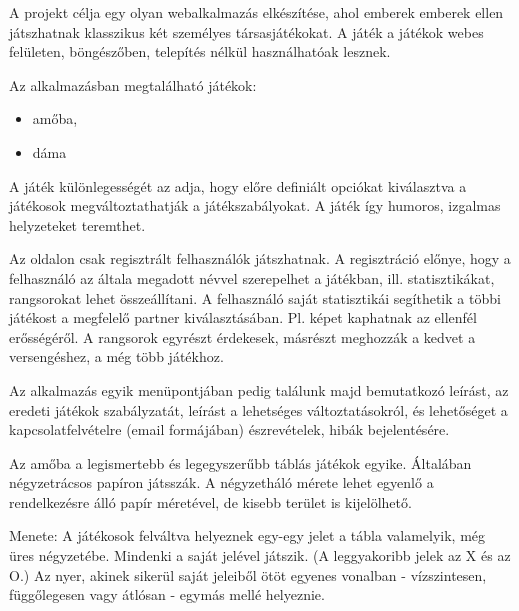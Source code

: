



A projekt célja egy olyan webalkalmazás elkészítése, ahol emberek emberek ellen játszhatnak klasszikus két személyes társasjátékokat. A játék a játékok webes felületen, böngészőben, telepítés nélkül használhatóak lesznek.

Az alkalmazásban megtalálható játékok:
\begin{itemize}
	\item amőba,
	\item dáma
\end{itemize}

A játék különlegességét az adja, hogy előre definiált opciókat kiválasztva a játékosok megváltoztathatják a játékszabályokat. A játék így humoros, izgalmas helyzeteket teremthet.

Az oldalon csak regisztrált felhasználók játszhatnak. A regisztráció előnye, hogy a felhasználó az általa megadott névvel szerepelhet a játékban, ill. statisztikákat, rangsorokat lehet összeállítani. A felhasználó saját statisztikái segíthetik a többi játékost a megfelelő partner kiválasztásában. Pl. képet kaphatnak az ellenfél erősségéről. A rangsorok egyrészt érdekesek, másrészt meghozzák a kedvet a versengéshez, a még több játékhoz.

Az alkalmazás egyik menüpontjában pedig találunk majd bemutatkozó leírást, az eredeti játékok szabályzatát, leírást a lehetséges változtatásokról, és lehetőséget a kapcsolatfelvételre (email formájában) észrevételek, hibák bejelentésére. 


Az amőba a legismertebb és legegyszerűbb táblás játékok egyike. Általában négyzetrácsos papíron játsszák. A négyzetháló mérete lehet egyenlő a rendelkezésre álló papír méretével, de kisebb terület is kijelölhető.

Menete: A játékosok felváltva helyeznek egy-egy jelet a tábla valamelyik, még üres négyzetébe. Mindenki a saját jelével játszik. (A leggyakoribb jelek az X és az O.) Az nyer, akinek sikerül saját jeleiből ötöt egyenes vonalban - vízszintesen, függőlegesen vagy átlósan - egymás mellé helyeznie.


